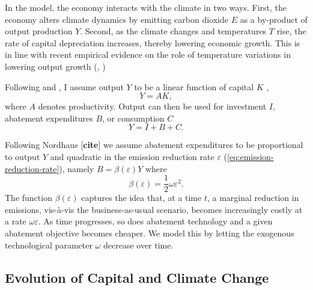 \documentclass[../../main.tex]{subfiles}
\begin{document}
In the model, the economy interacts with the climate in two ways. First, the economy alters climate dynamics by emitting carbon dioxide $E$ as a by-product of output production $Y$. Second, as the climate changes and temperatures $T$ rise, the rate of capital depreciation increases, thereby lowering economic growth. This is in line with recent empirical evidence on the role of temperature variations in lowering output growth (\citeauthor{dell_temperature_2009}, \citeyear{dell_temperature_2009, dell_temperature_2012}) 

Following  and , I assume output $Y$ to be a linear function of capital $K$ , \begin{equation}
Y =  A K,
\end{equation} where $A$ denotes productivity. Output can then be used for investment $I$, abatement expenditures $B$, or consumption $C$ \begin{equation} \label{eq:nominal-budget}
    Y = I + B + C.
\end{equation}

Following Nordhaus [\textbf{cite}] we assume abatement expenditures to be proportional to output $Y$ and quadratic in the emission reduction rate $\varepsilon$ (\ref{eq:emission-reduction-rate}), namely $B = \beta(\varepsilon) Y $ where \begin{equation} \label{eq:abatement-costs}
    \beta(\varepsilon) = \frac{1}{2} \omega \varepsilon^2.
\end{equation} The function $\beta(\varepsilon)$ captures the idea that, at a time $t$, a marginal reduction in emissions, vis-à-vis the business-as-usual scenario, becomes increasingly costly at a rate $\omega \varepsilon$. As time progresses, so does abatement technology and a given abatement objective becomes cheaper. We model this by letting the exogenous technological parameter $\omega$ decrease over time.

\subsection{Evolution of Capital and Climate Change}
\end{document}
